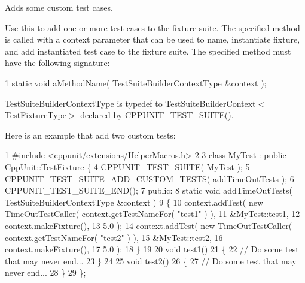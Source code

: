Adds some custom test cases. 

Use this to add one or more test cases to the fixture suite. The specified method is called with a context parameter that can be used to name, instantiate fixture, and add instantiated test case to the fixture suite. The specified method must have the following signature\+: 
\begin{DoxyCode}
1 static void aMethodName( TestSuiteBuilderContextType &context );
\end{DoxyCode}


{\ttfamily Test\+Suite\+Builder\+Context\+Type} is typedef to Test\+Suite\+Builder\+Context$<$\+Test\+Fixture\+Type$>$ declared by \hyperlink{group___writing_test_fixture_gabe1e12200f40d6f25d60c1783c99da81}{C\+P\+P\+U\+N\+I\+T\+\_\+\+T\+E\+S\+T\+\_\+\+S\+U\+I\+T\+E()}.

Here is an example that add two custom tests\+:


\begin{DoxyCode}
1 #include <cppunit/extensions/HelperMacros.h>
2 
3 class MyTest : public CppUnit::TestFixture \{
4   CPPUNIT\_TEST\_SUITE( MyTest );
5   CPPUNIT\_TEST\_SUITE\_ADD\_CUSTOM\_TESTS( addTimeOutTests );
6   CPPUNIT\_TEST\_SUITE\_END();
7 public:
8   static void addTimeOutTests( TestSuiteBuilderContextType &context )
9   \{
10     context.addTest( new TimeOutTestCaller( context.getTestNameFor( "test1" ) ),
11                                             &MyTest::test1,
12                                             context.makeFixture(),
13                                             5.0 );
14     context.addTest( new TimeOutTestCaller( context.getTestNameFor( "test2" ) ),
15                                             &MyTest::test2,
16                                             context.makeFixture(),
17                                             5.0 );
18   \}
19 
20   void test1()
21   \{
22     // Do some test that may never end...
23   \}
24 
25   void test2()
26   \{
27     // Do some test that may never end...
28   \}
29 \};
\end{DoxyCode}
 

